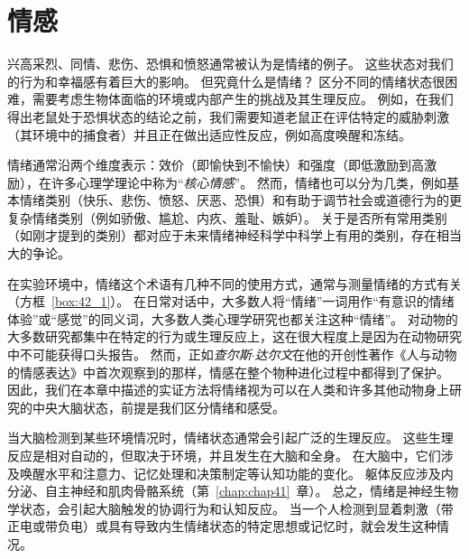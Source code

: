\chapter{情感} \label{chap:chap42}

兴高采烈、同情、悲伤、恐惧和愤怒通常被认为是情绪的例子。
这些状态对我们的行为和幸福感有着巨大的影响。
但究竟什么是情绪？
区分不同的情绪状态很困难，需要考虑生物体面临的环境或内部产生的挑战及其生理反应。
例如，在我们得出老鼠处于恐惧状态的结论之前，我们需要知道老鼠正在评估特定的威胁刺激（其环境中的捕食者）并且正在做出适应性反应，例如高度唤醒和冻结。


情绪通常沿两个维度表示：效价（即愉快到不愉快）和强度（即低激励到高激励），在许多心理学理论中称为“\textit{核心情感}”。
然而，情绪也可以分为几类，例如基本情绪类别（快乐、悲伤、愤怒、厌恶、恐惧）和有助于调节社会或道德行为的更复杂情绪类别（例如骄傲、尴尬、内疚、羞耻、嫉妒）。
关于是否所有常用类别（如刚才提到的类别）都对应于未来情绪神经科学中科学上有用的类别，存在相当大的争论。


在实验环境中，情绪这个术语有几种不同的使用方式，通常与测量情绪的方式有关（方框~\ref{box:42_1}）。
在日常对话中，大多数人将“情绪”一词用作“有意识的情绪体验”或“感觉”的同义词，大多数人类心理学研究也都关注这种“情绪”。
对动物的大多数研究都集中在特定的行为或生理反应上，这在很大程度上是因为在动物研究中不可能获得口头报告。
然而，正如\textit{查尔斯$\cdot$达尔文}在他的开创性著作《人与动物的情感表达》中首次观察到的那样，情感在整个物种进化过程中都得到了保护。
因此，我们在本章中描述的实证方法将情绪视为可以在人类和许多其他动物身上研究的中央大脑状态，前提是我们区分情绪和感受。


当大脑检测到某些环境情况时，情绪状态通常会引起广泛的生理反应。
这些生理反应是相对自动的，但取决于环境，并且发生在大脑和全身。
在大脑中，它们涉及唤醒水平和注意力、记忆处理和决策制定等认知功能的变化。
躯体反应涉及内分泌、自主神经和肌肉骨骼系统（第~\ref{chap:chap41}~章）。
总之，情绪是神经生物学状态，会引起大脑触发的协调行为和认知反应。
当一个人检测到显着刺激（带正电或带负电）或具有导致内生情绪状态的特定思想或记忆时，就会发生这种情况。


